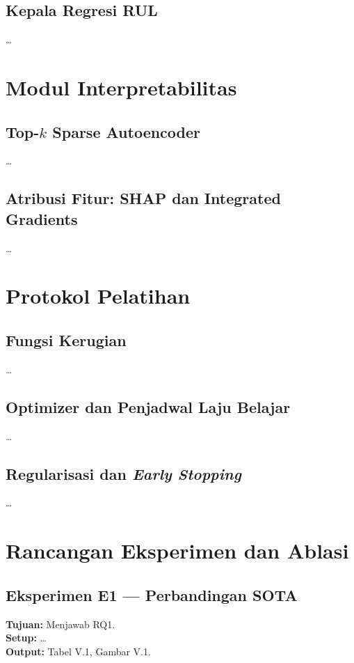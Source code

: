 \subsection{Kepala Regresi RUL}
\label{subsec:bab4_head}
\dots

\section{Modul Interpretabilitas}
\label{subsec:bab4_interp}

\subsection{Top-$k$ Sparse Autoencoder}
\label{subsec:bab4_sae}
\dots

\subsection{Atribusi Fitur: SHAP dan Integrated Gradients}
\label{subsec:bab4_shap_ig}
\dots

\section{Protokol Pelatihan}
\label{subsec:bab4_protokol}

\subsection{Fungsi Kerugian}
\label{subsec:bab4_loss}
\dots

\subsection{Optimizer dan Penjadwal Laju Belajar}
\label{subsec:bab4_optim}
\dots

\subsection{Regularisasi dan \emph{Early Stopping}}
\label{subsec:bab4_regul}
\dots

\section{Rancangan Eksperimen dan Ablasi}
\label{subsec:bab4_eksperimen}


\subsection*{Eksperimen E1 — Perbandingan SOTA}
\textbf{Tujuan:} Menjawab RQ1.\\
\textbf{Setup:} \dots\\
\textbf{Output:} Tabel V.1, Gambar V.1.

